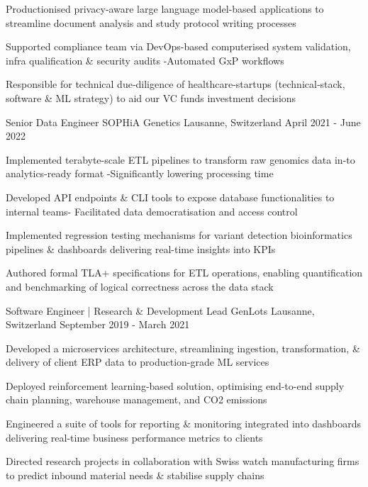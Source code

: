 \begin{cventries}
{\begin{cvitems}
        \item Productionised privacy‑aware large language model-based applications to streamline document analysis and study protocol writing processes
        \item Supported compliance team via DevOps-based computerised system validation, infra qualification \& security audits -Automated GxP workflows
        \item Responsible for technical due‑diligence of healthcare‑startups (technical‑stack, software \& ML strategy) to aid our VC funds investment decisions
      \end{cvitems}
    }
\vspace{-0.1cm}
	
 \cventry
    {Senior Data Engineer} %
    {SOPHiA Genetics} %
    {Lausanne, Switzerland} %
    {April 2021 - June 2022} %
    {
      \begin{cvitems} %
        \item {Implemented terabyte-scale ETL pipelines to transform raw genomics data in-to analytics-ready format -Significantly lowering processing time}
        \item {Developed API endpoints \& CLI tools to expose database functionalities to internal teams- Facilitated data democratisation and access control}
        \item {Implemented regression testing mechanisms for variant detection bioinformatics pipelines \& dashboards delivering real-time insights into KPIs}
        \item {Authored formal TLA+ specifications for ETL operations, enabling quantification and benchmarking of logical correctness across the data stack}
      \end{cvitems}
    }
    
    \vspace{-0.1cm}

  \cventry
    {Software Engineer | Research \& Development Lead} %
    {GenLots} %
    {Lausanne, Switzerland} %
    {September 2019 - March 2021} %
    {
      \begin{cvitems} %
        \item {Developed a microservices architecture, streamlining ingestion, transformation, \& delivery of client ERP data to production-grade ML services}
      	\item {Deployed reinforcement learning-based solution, optimising end-to-end supply chain planning, warehouse management, and CO2 emissions}
        \item {Engineered a suite of tools for reporting \& monitoring integrated into dashboards delivering real-time business performance metrics to clients}
        \item {Directed research projects in collaboration with Swiss watch manufacturing firms to predict inbound material needs \& stabilise supply chains}
      \end{cvitems}
    } 
   

\end{cventries}

